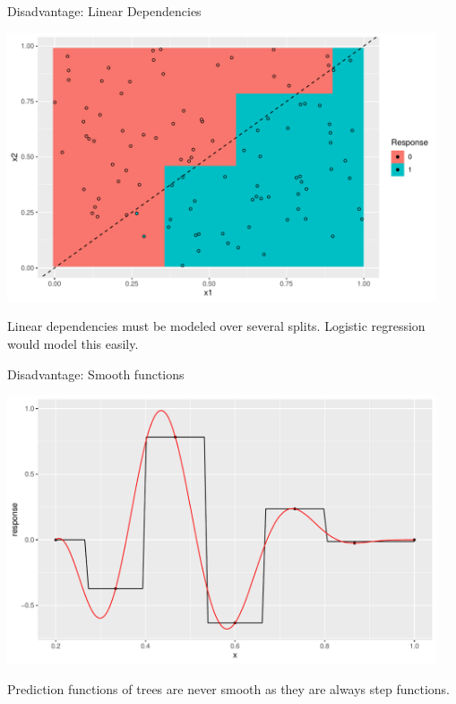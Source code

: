 \documentclass[11pt,compress,t,notes=noshow, xcolor=table]{beamer}
\newenvironment{knitrout}{}{} %
\begin{document}
\begin{vbframe}{Disadvantage: Linear Dependencies}
\begin{knitrout}\scriptsize
{}\color{fgcolor}

{\centering \includegraphics[width=0.95\textwidth]{figure/cart_dis_1} 

}



\end{knitrout}
Linear dependencies must be modeled over several splits. Logistic regression would model this easily.
\end{vbframe}

\begin{vbframe}{Disadvantage: Smooth functions}
\begin{knitrout}\scriptsize
{}\color{fgcolor}

{\centering \includegraphics[width=0.95\textwidth]{figure/cart_dis_2} 

}



\end{knitrout}
Prediction functions of trees are never smooth as they are always step functions.
\end{vbframe}
\end{document}
